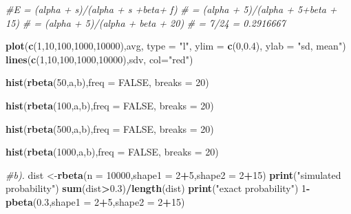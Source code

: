 \documentclass[]{article}
\newenvironment{Shaded}{\begin{snugshade}}{\end{snugshade}}
\newcommand{\CommentTok}[1]{\textcolor[rgb]{0.56,0.35,0.01}{\textit{#1}}}
\newcommand{\DataTypeTok}[1]{\textcolor[rgb]{0.13,0.29,0.53}{#1}}
\newcommand{\DecValTok}[1]{\textcolor[rgb]{0.00,0.00,0.81}{#1}}
\newcommand{\FloatTok}[1]{\textcolor[rgb]{0.00,0.00,0.81}{#1}}
\newcommand{\KeywordTok}[1]{\textcolor[rgb]{0.13,0.29,0.53}{\textbf{#1}}}
\newcommand{\NormalTok}[1]{#1}
\newcommand{\OperatorTok}[1]{\textcolor[rgb]{0.81,0.36,0.00}{\textbf{#1}}}
\newcommand{\OtherTok}[1]{\textcolor[rgb]{0.56,0.35,0.01}{#1}}
\newcommand{\StringTok}[1]{\textcolor[rgb]{0.31,0.60,0.02}{#1}}
\begin{document}
\begin{Shaded}
\begin{Highlighting}[]
\CommentTok{#E = (alpha + s)/(alpha + s +beta+ f)}
\CommentTok{# = (alpha + 5)/(alpha + 5+beta + 15)}
\CommentTok{# = (alpha + 5)/(alpha + beta + 20)}
\CommentTok{# = 7/24 = 0.2916667}

\KeywordTok{plot}\NormalTok{(}\KeywordTok{c}\NormalTok{(}\DecValTok{1}\NormalTok{,}\DecValTok{10}\NormalTok{,}\DecValTok{100}\NormalTok{,}\DecValTok{1000}\NormalTok{,}\DecValTok{10000}\NormalTok{),avg, }\DataTypeTok{type =} \StringTok{"l"}\NormalTok{, }\DataTypeTok{ylim =} \KeywordTok{c}\NormalTok{(}\DecValTok{0}\NormalTok{,}\FloatTok{0.4}\NormalTok{), }\DataTypeTok{ylab =} \StringTok{"sd, mean"}\NormalTok{)}
\KeywordTok{lines}\NormalTok{(}\KeywordTok{c}\NormalTok{(}\DecValTok{1}\NormalTok{,}\DecValTok{10}\NormalTok{,}\DecValTok{100}\NormalTok{,}\DecValTok{1000}\NormalTok{,}\DecValTok{10000}\NormalTok{),sdv, }\DataTypeTok{col=}\StringTok{"red"}\NormalTok{)}

\KeywordTok{hist}\NormalTok{(}\KeywordTok{rbeta}\NormalTok{(}\DecValTok{50}\NormalTok{,a,b),}\DataTypeTok{freq =} \OtherTok{FALSE}\NormalTok{, }\DataTypeTok{breaks =} \DecValTok{20}\NormalTok{)}

\KeywordTok{hist}\NormalTok{(}\KeywordTok{rbeta}\NormalTok{(}\DecValTok{100}\NormalTok{,a,b),}\DataTypeTok{freq =} \OtherTok{FALSE}\NormalTok{, }\DataTypeTok{breaks =} \DecValTok{20}\NormalTok{)}

\KeywordTok{hist}\NormalTok{(}\KeywordTok{rbeta}\NormalTok{(}\DecValTok{500}\NormalTok{,a,b),}\DataTypeTok{freq =} \OtherTok{FALSE}\NormalTok{, }\DataTypeTok{breaks =} \DecValTok{20}\NormalTok{)}

\KeywordTok{hist}\NormalTok{(}\KeywordTok{rbeta}\NormalTok{(}\DecValTok{1000}\NormalTok{,a,b),}\DataTypeTok{freq =} \OtherTok{FALSE}\NormalTok{, }\DataTypeTok{breaks =} \DecValTok{20}\NormalTok{)}

\CommentTok{#b).}
\NormalTok{dist <-}\KeywordTok{rbeta}\NormalTok{(}\DataTypeTok{n =} \DecValTok{10000}\NormalTok{,}\DataTypeTok{shape1 =} \DecValTok{2}\OperatorTok{+}\DecValTok{5}\NormalTok{,}\DataTypeTok{shape2 =} \DecValTok{2}\OperatorTok{+}\DecValTok{15}\NormalTok{)}
\KeywordTok{print}\NormalTok{(}\StringTok{"simulated probability"}\NormalTok{)}
\KeywordTok{sum}\NormalTok{(dist}\OperatorTok{>}\FloatTok{0.3}\NormalTok{)}\OperatorTok{/}\KeywordTok{length}\NormalTok{(dist)}
\KeywordTok{print}\NormalTok{(}\StringTok{"exact probability"}\NormalTok{)}
\DecValTok{1}\OperatorTok{-}\KeywordTok{pbeta}\NormalTok{(}\FloatTok{0.3}\NormalTok{,}\DataTypeTok{shape1 =} \DecValTok{2}\OperatorTok{+}\DecValTok{5}\NormalTok{,}\DataTypeTok{shape2 =} \DecValTok{2}\OperatorTok{+}\DecValTok{15}\NormalTok{)}


\end{Highlighting}
\end{Shaded}
\end{document}
